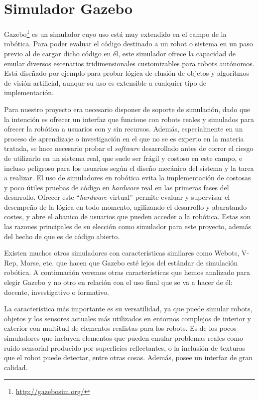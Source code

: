 \section{Simulador Gazebo}

Gazebo\footnote{\url{http://gazebosim.org/}} es un simulador cuyo uso está muy extendido en el campo de la robótica. Para poder evaluar el código destinado a un robot o sistema en un paso previo al de cargar dicho código en él, este simulador ofrece la capacidad de emular diversos escenarios tridimensionales customizables para robots autónomos. Está diseñado por ejemplo para probar lógica de elusión de objetos y algoritmos de visión artificial, aunque su uso es extensible a cualquier tipo de implementación. 

Para nuestro proyecto era necesario disponer de soporte de simulación, dado que la intención es ofrecer un interfaz que funcione con robots reales y simulados para ofrecer la robótica a usuarios con y sin recursos. Además, especialmente en un proceso de aprendizaje o investigación en el que no se es experto en la materia tratada, se hace necesario probar el \textit{software} desarrollado antes de correr el riesgo de utilizarlo en un sistema real, que suele ser frágil y costoso en este campo, e incluso peligroso para los usuarios según el diseño mecánico del sistema y la tarea a realizar. El uso de simuladores en robótica evita la implementación de costosas y poco útiles pruebas de código en \textit{hardware} real en las primeras fases del desarrollo. Ofrecer este ``\textit{hardware} virtual'' permite evaluar y supervisar el desempeño de la lógica en todo momento, agilizando el desarrollo y abaratando costes, y abre el abanico de usuarios que pueden acceder a la robótica. Estas son las razones principales de su elección como simulador para este proyecto, además del hecho de que es de código abierto.

Existen muchos otros simuladores con características similares como Webots, V-Rep, Morse, etc. que hacen que Gazebo esté lejos del estándar de simulación robótica. A continuación veremos otras características que hemos analizado para elegir Gazebo y no otro en relación con el uso final que se va a hacer de él: docente, investigativo o formativo.

La característica más importante es su versatilidad, ya que puede simular robots, objetos y los sensores actuales más utilizados en entornos complejos de
interior y exterior con multitud de elementos realistas para los robots. Es de los pocos simuladores que incluyen elementos que pueden emular problemas reales como ruido sensorial producido por superficies reflectantes, o la inclusión de texturas que el robot puede detectar, entre otras cosas. Además, posee un interfaz de gran calidad.

